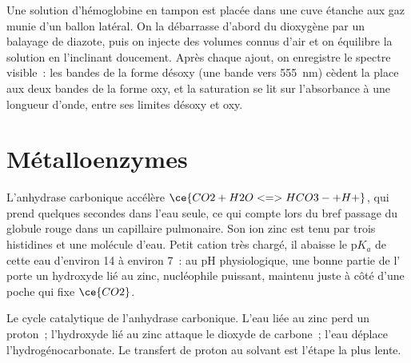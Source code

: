 \begin{inthelab}
Une solution d'hémoglobine en tampon est placée dans une cuve étanche aux
gaz munie d'un ballon latéral. On la débarrasse d'abord du dioxygène par un
balayage de diazote, puis on injecte des volumes connus d'air et on
équilibre la solution en l'inclinant doucement. Après chaque ajout, on
enregistre le spectre visible~: les bandes de la forme désoxy (une bande vers \qty{555}{nm}) cèdent la place aux deux bandes de la forme oxy,
et la saturation se lit sur l'absorbance à une longueur d'onde, entre ses
limites désoxy et oxy.
\end{inthelab}

\section{Métalloenzymes}

L'anhydrase carbonique accélère $\ce{CO2 + H2O <=> HCO3- + H+}$, qui prend quelques secondes dans l'eau
seule, ce qui compte lors du bref passage du globule rouge dans un
capillaire pulmonaire. Son ion zinc est tenu par trois histidines et une
molécule d'eau. Petit cation très chargé, il abaisse le $\mathrm pK_a$ de cette eau d'environ 14 à
environ 7~: au pH physiologique, une bonne partie de l' porte un
hydroxyde lié au zinc, nucléophile puissant, maintenu juste à côté d'une poche qui fixe $\ce{CO2}$.

\begin{omfigure}

{\small Le cycle catalytique de l'anhydrase carbonique. L'eau liée au zinc
perd un proton~; l'hydroxyde lié au zinc attaque le dioxyde de carbone~;
l'eau déplace l'hydrogénocarbonate. Le transfert de proton au solvant est
l'étape la plus lente.}
\end{omfigure}

